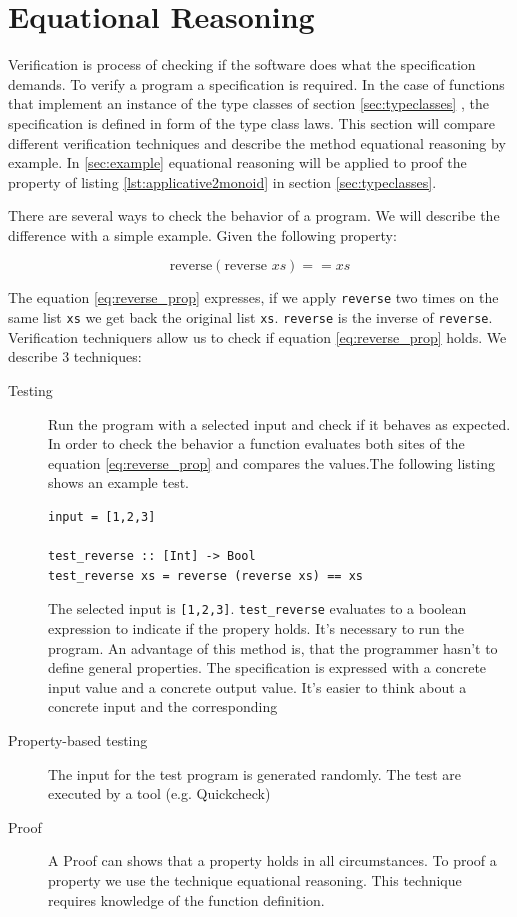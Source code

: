 \section{Equational Reasoning}
\label{sec:equationalreasoning}

Verification is process of checking if the software does what the specification demands. To verify a program a specification is required. In the case of functions that implement an instance of the type classes of section \ref{sec:typeclasses} , the specification is defined in form of the type class laws.
This section will compare different verification techniques and describe the method equational reasoning by example. In \ref{sec:example} equational reasoning will be applied to proof the property of listing \ref{lst:applicative2monoid} in section \ref{sec:typeclasses}.

There are several ways to check the behavior of a program. 
We will describe the difference with a simple example. Given the following property:

\begin{equation}
  \label{eq:reverse_prop}
\text{reverse} (\text{reverse } xs) == xs  
\end{equation}

The equation \ref{eq:reverse_prop} expresses, if we apply \verb|reverse| two times on the same list \verb|xs| we get back the original list \verb|xs|. \verb|reverse| is the inverse of \verb|reverse|. Verification techniquers allow us to check if equation \ref{eq:reverse_prop} holds. We describe 3 techniques:

\begin{description}
\item[Testing] Run the program with a selected input and check if it behaves as expected. In order to check the behavior a function evaluates both sites of the equation \ref{eq:reverse_prop} and compares the values.The following listing shows an example test.

\begin{verbatim}
input = [1,2,3]

test_reverse :: [Int] -> Bool
test_reverse xs = reverse (reverse xs) == xs
\end{verbatim}

The selected input is \verb|[1,2,3]|. \verb|test_reverse| evaluates to a boolean expression to indicate if the propery holds. It's necessary to run the program.
An advantage of this method is, that the programmer hasn't to define general properties. The specification is expressed with a concrete input value and a concrete output value. It's easier to think about a concrete input and the corresponding 
\item[Property-based testing] The input for the test program is generated randomly. The test are executed by a tool (e.g. Quickcheck)
\item[Proof] A Proof can shows that a property holds in all circumstances. To proof a property we use the technique equational reasoning. This technique requires knowledge of the function definition.
\end{description}

